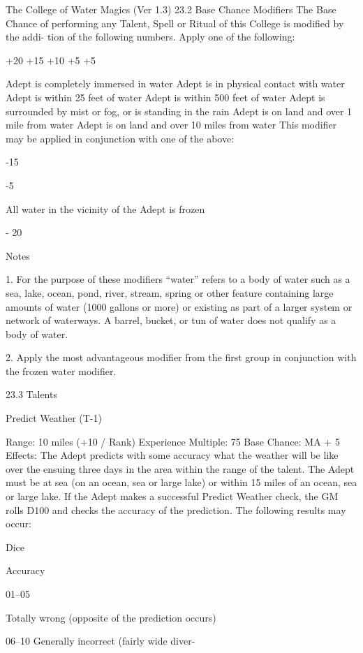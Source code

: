 \begin{Chapter}{The College of Water Magics (Ver 1.3)}
23.2 Base Chance Modifiers 
The  Base  Chance  of  performing  any  Talent,  Spell 
or  Ritual  of  this  College  is  modified  by  the  addi-
tion  of  the  following  numbers.  Apply  one  of  the 
following: 

+20 
+15 
+10 
+5 
+5  

Adept is completely immersed in water 
Adept is in physical contact with water 
Adept is within 25 feet of water 
Adept is within 500 feet of water 
Adept is surrounded by mist or fog, or is 
standing in the rain 
Adept is on land and over 1 mile from 
water 
Adept is on land and over 10 miles from 
water 
This  modifier  may  be  applied  in  conjunction  with 
one of the above: 

-15 

-5 

All  water  in  the  vicinity  of  the  Adept  is 
frozen 

-
20 

Notes 

1. For the purpose of these modifiers “water” refers 
to a body of water such as a sea, lake, ocean, pond, 
river,  stream,  spring  or  other  feature  containing 
large  amounts  of  water  (1000  gallons  or  more)  or 
existing  as  part  of  a  larger  system  or  network  of 
waterways.  A  barrel,  bucket,  or  tun  of  water  does 
not qualify as a body of water. 

2. Apply the most advantageous modifier from the 
first  group  in  conjunction  with  the  frozen  water 
modifier. 

23.3 Talents  

Predict Weather (T-1)  

Range: 10 miles (+10 / Rank) 
Experience Multiple: 75 
Base Chance: MA + 5%
Effects:  The  Adept  predicts  with  some  accuracy 
what  the  weather  will  be  like  over  the  ensuing 
three days in the area within the range of the talent. 
The Adept must be at sea (on an ocean, sea or large 
lake)  or  within  15  miles  of  an  ocean,  sea  or  large 
lake.  If  the  Adept  makes  a  successful  Predict 
Weather check, the GM rolls D100 and checks the 
accuracy  of  the  prediction.  The  following  results 
may occur: 

Dice 

Accuracy 

01–05 

Totally wrong (opposite of the prediction 
occurs) 

06–10  Generally incorrect (fairly wide diver-


\end{Chapter}
